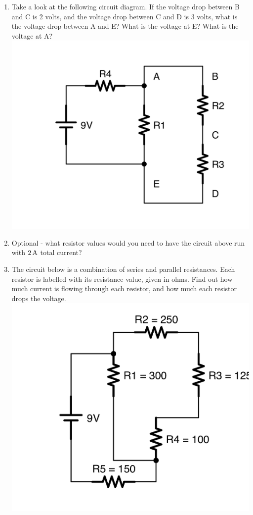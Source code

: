 \begin{enumerate}
\item Take a look at the following circuit diagram.  If the voltage drop between B and C is 2 volts, and the voltage drop between C and D is 3 volts, what is the voltage drop between A and E?  What is the voltage at E?  What is the voltage at A? \\ \includegraphics[scale=0.08]{VoltageDropProblem.png}
\item Optional - what resistor values would you need to have the circuit above run with $2\,\si{\ampere}$ total current?
\item The circuit below is a combination of series and parallel resistances.  Each resistor is labelled with its resistance value, given in ohms.  Find out how much current is flowing through each resistor, and how much each resistor drops the voltage.  \\ \includegraphics[scale=0.08]{ProblemCalculateCurrentAndVoltage}
\end{enumerate}
